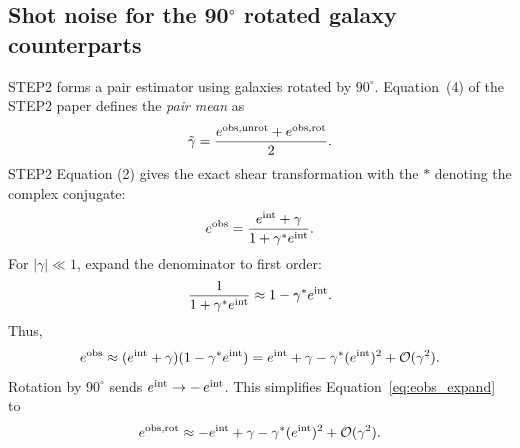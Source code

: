\documentclass[11pt]{EuclidVIS}
\numberwithin{table}{section}
\numberwithin{figure}{section}
\begin{document}
\subsection*{Shot noise for the 90$^\circ$ rotated galaxy counterparts}
STEP2 forms a pair estimator using galaxies rotated by $90^\circ$.
Equation~(4) of the STEP2 paper defines the {\em pair mean} as
\begin{equation}
\tilde{\gamma}
    = \frac{e^{\rm obs,unrot} + e^{\rm obs,rot}}{2}.
\label{eq:ellipticiy_pair}
\end{equation}
STEP2 Equation (2) gives the exact shear transformation with the
$\ast$ denoting the complex conjugate:
\begin{equation}
e^{\rm obs} 
    = \frac{e^{\rm int} + \gamma}{1 + \gamma^\ast e^{\rm int}}.
\end{equation}
For $|\gamma|\ll1$, expand the denominator to first order:
\begin{equation}
\frac{1}{1 + \gamma^\ast e^{\rm int}}
    \approx 1 - \gamma^\ast e^{\rm int}.
\end{equation}
Thus,
\begin{equation}
e^{\rm obs}
    \approx 
    (e^{\rm int} + \gamma)
    (1 - \gamma^\ast e^{\rm int})
    =
    e^{\rm int} + \gamma
    - \gamma^\ast (e^{\rm int})^2
    + {\cal O}(\gamma^2).
\label{eq:eobs_expand}
\end{equation}
Rotation by $90^\circ$ sends $e^{\rm int} \rightarrow -\,e^{\rm int}$.  
This simplifies Equation~\eqref{eq:eobs_expand} to
\begin{equation}
e^{\rm obs,rot}
    \approx 
    - e^{\rm int}
    + \gamma
    - \gamma^\ast (e^{\rm int})^2
    + {\cal O}(\gamma^2).
\end{equation}

\end{document}

